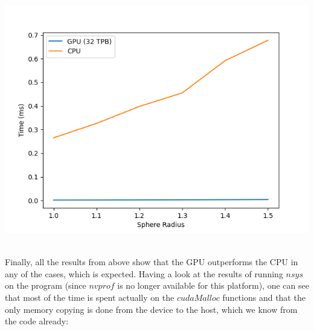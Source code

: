 \documentclass[english]{exam}
\begin{document}
\begin{center}
  \includegraphics[scale=0.6]{plot3.png}
\end{center}

\clearpage
\ \\
\noindent
Finally, all the results from above show that the GPU outperforms the CPU in any of the cases, which is expected. Having a look at the results of running $nsys$ on the program (since $nvprof$ is no longer available for this platform), one can see that most of the time is spent actually on the $cudaMalloc$ functions and that the only memory copying is done from the device to the host, which we know from the code already: \\
\end{document}
